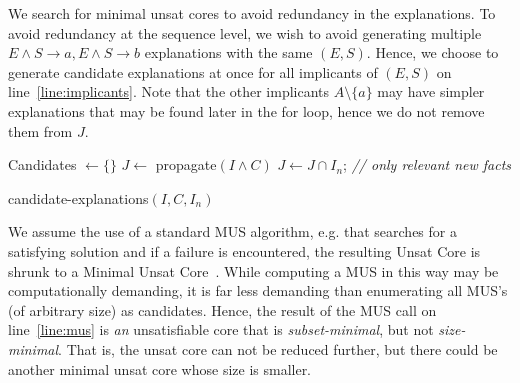 We search for minimal unsat cores to avoid redundancy in the explanations. To avoid redundancy at the sequence level, we wish to avoid generating multiple $E \wedge S \rightarrow a, E \wedge S \rightarrow b$ explanations with the same $(E, S)$. Hence, we choose to generate candidate explanations at once for all implicants of $(E, S)$ on line~\ref{line:implicants}. Note that the other implicants $A \setminus \{a\}$ may have simpler explanations that may be found later in the for loop, hence we do not remove them from $J$.

\begin{algorithm}
% 

% 

  Candidates $\gets \{\}$\;
  $J \gets$ propagate$(I \wedge C)$\;
  $J \gets J \cap I_n$; \textit{\small // only relevant new facts}\\
\caption{candidate-explanations$(I,C,I_n)$}

\label{alg:cand}
\end{algorithm}


We assume the use of a standard MUS algorithm, e.g. that searches for a satisfying solution and if a failure is encountered, the resulting Unsat Core is shrunk to a Minimal Unsat Core~\cite{}. While computing a MUS in this way may be computationally demanding, it is far less demanding than enumerating all MUS's (of arbitrary size) as candidates. 
Hence, the result of the MUS call on line~\ref{line:mus} is \textit{an} unsatisfiable core that is \textit{subset-minimal}, but not \textit{size-minimal}. That is, the unsat core can not be reduced further, but there could be another minimal unsat core whose size is smaller.

